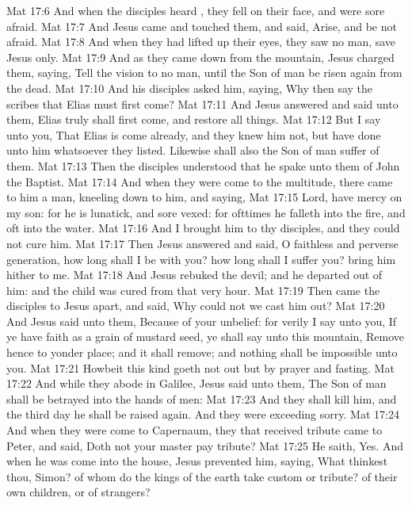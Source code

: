 \vs Mat 17:6 And when the disciples heard , they fell on their face, and were sore afraid.
\vs Mat 17:7 And Jesus came and touched them, and said, Arise, and be not afraid.
\vs Mat 17:8 And when they had lifted up their eyes, they saw no man, save Jesus only.
\vs Mat 17:9 And as they came down from the mountain, Jesus charged them, saying, Tell the vision to no man, until the Son of man be risen again from the dead.
\vs Mat 17:10 And his disciples asked him, saying, Why then say the scribes that Elias must first come?
\vs Mat 17:11 And Jesus answered and said unto them, Elias truly shall first come, and restore all things.
\vs Mat 17:12 But I say unto you, That Elias is come already, and they knew him not, but have done unto him whatsoever they listed. Likewise shall also the Son of man suffer of them.
\vs Mat 17:13 Then the disciples understood that he spake unto them of John the Baptist.
\vs Mat 17:14 And when they were come to the multitude, there came to him a  man, kneeling down to him, and saying,
\vs Mat 17:15 Lord, have mercy on my son: for he is lunatick, and sore vexed: for ofttimes he falleth into the fire, and oft into the water.
\vs Mat 17:16 And I brought him to thy disciples, and they could not cure him.
\vs Mat 17:17 Then Jesus answered and said, O faithless and perverse generation, how long shall I be with you? how long shall I suffer you? bring him hither to me.
\vs Mat 17:18 And Jesus rebuked the devil; and he departed out of him: and the child was cured from that very hour.
\vs Mat 17:19 Then came the disciples to Jesus apart, and said, Why could not we cast him out?
\vs Mat 17:20 And Jesus said unto them, Because of your unbelief: for verily I say unto you, If ye have faith as a grain of mustard seed, ye shall say unto this mountain, Remove hence to yonder place; and it shall remove; and nothing shall be impossible unto you.
\vs Mat 17:21 Howbeit this kind goeth not out but by prayer and fasting.
\vs Mat 17:22 And while they abode in Galilee, Jesus said unto them, The Son of man shall be betrayed into the hands of men:
\vs Mat 17:23 And they shall kill him, and the third day he shall be raised again. And they were exceeding sorry.
\vs Mat 17:24 And when they were come to Capernaum, they that received tribute  came to Peter, and said, Doth not your master pay tribute?
\vs Mat 17:25 He saith, Yes. And when he was come into the house, Jesus prevented him, saying, What thinkest thou, Simon? of whom do the kings of the earth take custom or tribute? of their own children, or of strangers?

